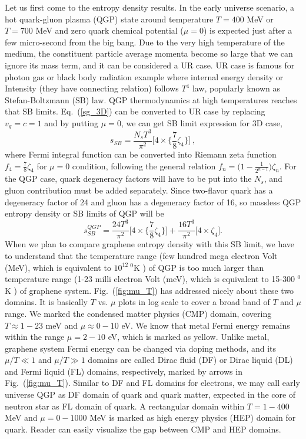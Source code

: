 \documentclass[amsmath,amssymb,aps,prb]{revtex4-2}
\newcommand{\be}{\begin{equation}}
\newcommand{\ee}{\end{equation}}
\begin{document}
    Let us first come to the entropy density results. In the early universe scenario, a hot quark-gluon plasma (QGP) state around temperature $T=400$ MeV or $T=700$ MeV and zero quark chemical potential ($\mu=0$) is expected just after a few micro-second from the big bang. Due to the very high temperature of the medium, the constituent particle average momenta become so large that we can ignore its mass term, and it can be considered a UR case. UR case is famous for photon gas or black body radiation example where internal energy density or Intensity (they have connecting relation) follows $T^4$ law, popularly known as Stefan-Boltzmann (SB) law. QGP thermodynamics at high temperatures reaches that SB limits. Eq.~(\ref{sg_3D}) can be converted to UR case by replacing $v_g=c=1$ and by putting $\mu=0$, we can get SB limit expression for 3D case,
    \be 
    s_{SB} = \frac{N_s T^3}{\pi^2 } \Bigg[4\times \Big\{\frac{7}{8}\zeta_4\Big\} \Bigg]~,
    \label{sSB_3D}
    \ee 
    where Fermi integral function can be converted into Riemann zeta function $f_4=\frac{7}{8}\zeta_4$ for $\mu=0$ condition, following the general relation $f_n=\Big(1-\frac{1}{2^{n-1}}\Big)\zeta_n$. For the QGP case, quark degeneracy factors will have to be put into the $N_s$, and gluon contribution must be added separately. Since two-flavor quark has a degeneracy factor of 24 and gluon has a degeneracy factor of 16, so massless QGP entropy density or SB limits of QGP will be 
    \be 
    s^{QGP}_{SB} = \frac{24 T^3}{\pi^2 } \Big[4\times \Big\{\frac{7}{8}\zeta_4\Big\} \Big]+\frac{16 T^3}{\pi^2 } \Big[4\times \zeta_4 \Big].
    \label{s_QGP}
    \ee 
    When we plan to compare graphene entropy density with this SB limit, we have to understand that the temperature range (few hundred mega electron Volt (MeV), which is equivalent to $10^{12}~^0$K ) of QGP is too much larger than temperature range (1-23 milli electron Volt (meV), which is equivalent to 15-300 $^0$K ) of graphene system. Fig.~(\ref{fig:mu_T}) has addressed nicely about these two domains. It is basically $T$ vs. $\mu$ plots in log scale to cover a broad band of $T$ and $\mu$ range. We marked the condensed matter physics (CMP) domain, covering  $T\approx 1-23$ meV and $\mu\approx 0-10$ eV. We know that metal Fermi energy remains within the range $\mu=2-10$ eV, which is marked as yellow. Unlike metal, graphene system Fermi energy can be changed via doping methods, and its $\mu/T\ll 1$ and $\mu/T\gg 1$ domains are called Dirac fluid (DF) or Dirac liquid (DL) and Fermi liquid (FL) domains, respectively, marked by arrows in Fig.~(\ref{fig:mu_T}). Similar to DF and FL domains for electrons, we may call early universe QGP as DF domain of quark and quark matter, expected in the core of neutron star as FL domain of quark. A rectangular domain within $T=1-400$ MeV and $\mu=0-1000$ MeV is marked as high energy physics (HEP) domain for quark. Reader can easily visualize the gap between CMP and HEP domains.
\end{document}
